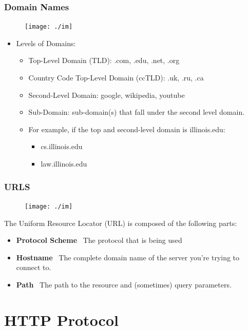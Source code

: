 \documentclass{beamer}
\begin{document}
%
%
\begin{frame}[fragile]
    \frametitle{Domain Names}
    \begin{figure}
        \texttt{[image: ./im]}
    \end{figure}
    \begin{itemize}
        \item Levels of Domains:
        \begin{itemize}
            \item Top-Level Domain (TLD): .com, .edu, .net, .org 
            \item Country Code Top-Level Domain (ccTLD): .uk, .ru, .ca
            \item Second-Level Domain: google, wikipedia, youtube
            \item Sub-Domain: sub-domain(s) that fall under the second level domain. 
            \item For example, if the top and second-level domain is illinois.edu:
            \begin{itemize}
                \item cs.illinois.edu
                \item law.illinois.edu
            \end{itemize}
        \end{itemize}
    \end{itemize}
\end{frame}

%
%
\begin{frame}[fragile]
    \frametitle{URLS}
    \begin{figure}
        \texttt{[image: ./im]}
    \end{figure}
    The Uniform Resource Locator (URL) is composed of the following parts:
    \begin{itemize}
        \item \textbf{Protocol Scheme} \textrightarrow \  The protocol that is being used 
        \item \textbf{Hostname} \textrightarrow \ The complete domain name of the server you're trying to connect to.
        \item \textbf{Path} \textrightarrow \ The path to the resource and (sometimes) query parameters.
    \end{itemize}
\end{frame}



\section{HTTP Protocol}
\end{document}
